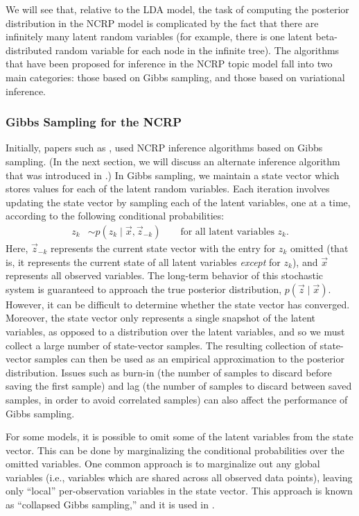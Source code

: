 \documentclass{article}
\begin{document}
We will see that, relative to the LDA model, the task of computing the posterior distribution in the NCRP model is complicated by the fact that there are infinitely many latent random variables (for example, there is one latent beta-distributed random variable for each node in the infinite tree).
The algorithms that have been proposed for inference in the NCRP topic model fall into two main categories: those based on Gibbs sampling, and those based on variational inference.

\subsubsection{Gibbs Sampling for the NCRP}

Initially, papers such as \cite{griffiths2004hierarchical}, used NCRP inference algorithms based on Gibbs sampling.
(In the next section, we will discuss an alternate inference algorithm that was introduced in \cite{wang2009vi_ncrp}.)
In Gibbs sampling, we maintain a state vector which stores values for each of the latent random variables.
Each iteration involves updating the state vector by sampling each of the latent variables, one at a time, according to the following conditional probabilities:
\begin{align}
z_k &\sim p(z_k \mid \vec x, \vec z_{-k}) \qquad \text{for all latent variables $z_k$.}
\end{align}
Here, $\vec z_{-k}$ represents the current state vector with the entry for $z_k$ omitted (that is, it represents the current state of all latent variables \emph{except} for $z_k$), and $\vec x$ represents all observed variables.
The long-term behavior of this stochastic system is guaranteed to approach the true posterior distribution, $p(\vec z \mid \vec x)$.
However, it can be difficult to determine whether the state vector has converged.
Moreover, the state vector only represents a single snapshot of the latent variables, as opposed to a distribution over the latent variables, and so we must collect a large number of state-vector samples.
The resulting collection of state-vector samples can then be used as an empirical approximation to the posterior distribution.
Issues such as burn-in (the number of samples to discard before saving the first sample) and lag (the number of samples to discard between saved samples, in order to avoid correlated samples) can also affect the performance of Gibbs sampling.

For some models, it is possible to omit some of the latent variables from the state vector.
This can be done by marginalizing the conditional probabilities over the omitted variables.
One common approach is to marginalize out any global variables (i.e., variables which are shared across all observed data points), leaving only ``local'' per-observation variables in the state vector.
This approach is known as ``collapsed Gibbs sampling,'' and it is used in \cite{blei2010ncrp}.
\end{document}
